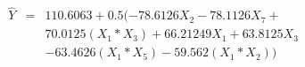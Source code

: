 

\[
\begin{array}{lll} \hat{Y} & = & 110.6063 + 0.5(-78.6126X_2 - 78.1126X_7 + \\ &   & 70.0125(X_1*X_3) + 66.21249X_1 + 63.8125X_3 \\ & & -63.4626(X_1*X_5) -59.562(X_1*X_2)) \end{array}

\]


